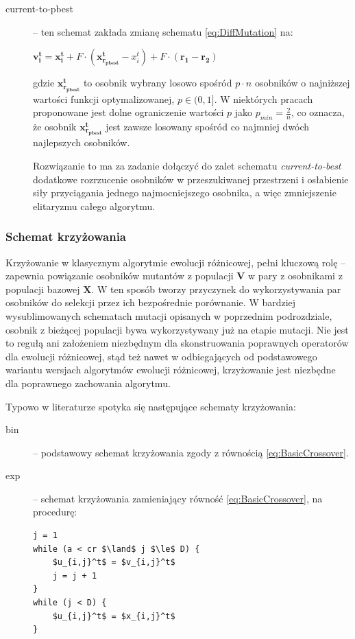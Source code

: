 \documentclass[12pt,a4paper]{report}
\begin{document}
{{{{\begin{description}
\item[current-to-pbest] \cite{JADE} -- ten schemat zakłada zmianę schematu \ref{eq:DiffMutation} na:

\begin{center}
 $\mathbf{v_i^{t}} = \mathbf{x_i^t} + F \cdot (\mathbf{x_{r_{pbest}}^t} - x_i^t) + F \cdot (\mathbf{r_1} - \mathbf{r_{2}})$
\end{center}
gdzie $\mathbf{x_{r_{pbest}}^t}$ to osobnik wybrany losowo spośród $p \cdot n$ osobników o najniższej wartości funkcji optymalizowanej, $p \in (0,1]$. W niektórych pracach \cite{SHADE} proponowane jest dolne ograniczenie wartości $p$ jako $p_{min} = \frac{2}{n}$, co oznacza, że osobnik $\mathbf{x_{r_{pbest}}^t}$ jest zawsze losowany spośród co najmniej dwóch najlepszych osobników.

Rozwiązanie to ma za zadanie dołączyć do zalet schematu \emph{current-to-best} dodatkowe rozrzucenie osobników w przeszukiwanej przestrzeni i osłabienie siły przyciągania jednego najmocniejszego osobnika, a więc zmniejszenie elitaryzmu całego algorytmu.




\end{description}
}
\subsubsection{Schemat krzyżowania}
\par{
Krzyżowanie w klasycznym algorytmie ewolucji różnicowej, pełni kluczową rolę -- zapewnia powiązanie osobników mutantów z populacji $\mathbf{V}$ w pary z osobnikami z populacji bazowej $\mathbf{X}$. W ten sposób tworzy przyczynek do wykorzystywania par osobników do selekcji przez ich bezpośrednie porównanie. W bardziej wysublimowanych schematach mutacji opisanych w poprzednim podrozdziale, osobnik z bieżącej populacji bywa wykorzystywany już na etapie mutacji. Nie jest to regułą ani założeniem niezbędnym dla skonstruowania poprawnych operatorów dla ewolucji różnicowej, stąd też nawet w odbiegających od podstawowego wariantu wersjach algorytmów ewolucji różnicowej, krzyżowanie jest niezbędne dla poprawnego zachowania algorytmu.
}

\par{
Typowo w literaturze spotyka się następujące schematy krzyżowania:
\begin{description}
\item[bin] -- podstawowy schemat krzyżowania zgody z równością \ref{eq:BasicCrossover}.
\item[exp] -- schemat krzyżowania zamieniający równość \ref{eq:BasicCrossover}, na procedurę:
\lstset{language=C}
\begin{lstlisting}[frame=single,mathescape]
j = 1
while (a < cr $\land$ j $\le$ D) {
	$u_{i,j}^t$ = $v_{i,j}^t$
	j = j + 1
}
while (j < D) {
	$u_{i,j}^t$ = $x_{i,j}^t$
}
\end{lstlisting}
\end{description}
}
}}}
\end{document}
